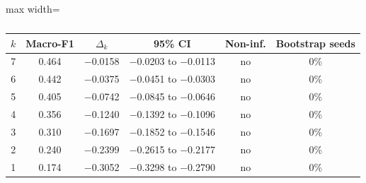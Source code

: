\begin{table}[t]
\centering
\small
\caption{}
\label{tab:bipolar}
\setlength{\tabcolsep}{4pt}
\begin{adjustbox}{max width=\textwidth}
\begin{tabular}{rccccc}
\toprule
$k$ & Macro-F1 & $\Delta_k$ & 95\% CI & Non-inf. & Bootstrap seeds \\
\midrule
7 & 0.464 & $-$0.0158 & $-$0.0203 to $-$0.0113 & no & 0\% \\
6 & 0.442 & $-$0.0375 & $-$0.0451 to $-$0.0303 & no & 0\% \\
5 & 0.405 & $-$0.0742 & $-$0.0845 to $-$0.0646 & no & 0\% \\
4 & 0.356 & $-$0.1240 & $-$0.1392 to $-$0.1096 & no & 0\% \\
3 & 0.310 & $-$0.1697 & $-$0.1852 to $-$0.1546 & no & 0\% \\
2 & 0.240 & $-$0.2399 & $-$0.2615 to $-$0.2177 & no & 0\% \\
1 & 0.174 & $-$0.3052 & $-$0.3298 to $-$0.2790 & no & 0\% \\
\bottomrule
\end{tabular}
\end{adjustbox}
\end{table}
